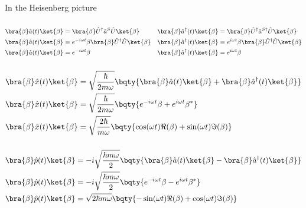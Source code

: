 \documentclass[12pt]{article}
\begin{document}
        In the Heisenberg picture 
        \subsubsection{} { \begin{align*}
            \bra{\beta} \hat{a}(t) \ket{\beta}  &= \bra{\beta} \hat{U}^\dagger \hat{a}^S \hat{U} \ket{\beta}  & \bra{\beta} \hat{a}^\dagger (t) \ket{\beta} &= \bra{\beta} \hat{U}^\dagger \hat{a}^{S\dagger}  \hat{U} \ket{\beta}  \\
            \bra{\beta} \hat{a}(t) \ket{\beta}  &= e^{ - i\omega t} \beta\bra{\beta} \hat{U}^\dagger  \hat{U} \ket{\beta}  & \bra{\beta} \hat{a}^\dagger (t) \ket{\beta} &= e^{ i\omega t} \beta\bra{\beta} \hat{U}^\dagger \hat{U} \ket{\beta}  \\
            \bra{\beta} \hat{a}(t) \ket{\beta}  &= e^{ - i\omega t} \beta  & \bra{\beta} \hat{a}^\dagger (t) \ket{\beta} &= e^{ i\omega t} \beta 
        \end{align*}}
        \subsubsection{} { \begin{align*}
            \bra{\beta} \hat{x}(t) \ket{\beta} &= \sqrt{\frac{\hbar}{2m \omega}}\bqty{\bra{\beta} \hat{a}(t) \ket{\beta} +\bra{\beta} \hat{a}^\dagger (t) \ket{\beta} } \\
            \bra{\beta} \hat{x}(t) \ket{\beta} &= \sqrt{\frac{\hbar}{2m \omega}}\bqty{ e^{ - i\omega t} \beta + e^{ i\omega t} \beta^*} \\
            \bra{\beta} \hat{x}(t) \ket{\beta} &= \sqrt{\frac{2\hbar}{m \omega}}\bqty{\cos(\omega t)\Re(\beta) + \sin(\omega t)\Im(\beta)}
        \end{align*}}
        \subsubsection{} { \begin{align*}
            \bra{\beta} \hat{p}(t) \ket{\beta} &= - i\sqrt{\frac{\hbar m\omega}{2} }\bqty{\bra{\beta} \hat{a}(t) \ket{\beta} - \bra{\beta} \hat{a}^\dagger (t) \ket{\beta} } \\
            \bra{\beta} \hat{p}(t) \ket{\beta} &= - i\sqrt{\frac{\hbar m\omega}{2} }\bqty{ e^{ - i\omega t}\beta - e^{ i\omega t} \beta^*} \\
            \bra{\beta} \hat{p}(t) \ket{\beta} &= \sqrt{2\hbar m\omega}\bqty{ -\sin(\omega t)\Re(\beta) + \cos(\omega t) \Im(\beta)}
        \end{align*}}
        
\end{document}
